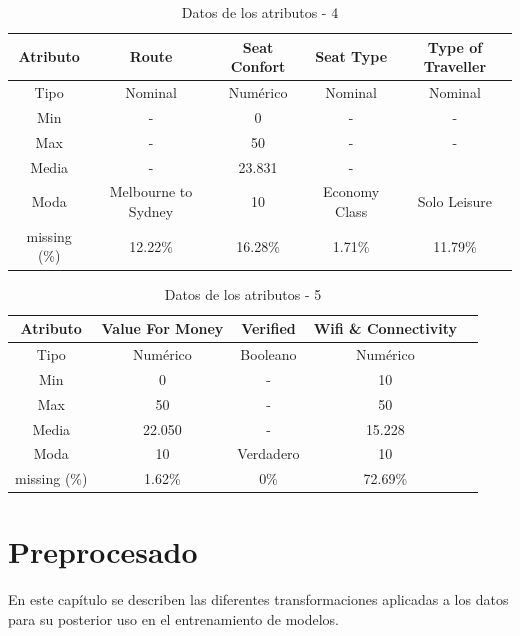 \documentclass[es]{uc3mreport}
\begin{document}
\begin{report}
\begin{table}[H]
    \center
    \begin{tabular}{@{}ccccc@{}}
        \toprule
        Atributo     & Route               & Seat Confort & Seat Type     & Type of Traveller \\ 
        \midrule
        Tipo         & Nominal             & Numérico     & Nominal       & Nominal           \\ 
        Min          & -                   & 0            & -             & -                 \\ 
        Max          & -                   & 50           & -             & -                 \\ 
        Media        & -                   & 23.831       & -             &                   \\ 
        Moda         & Melbourne to Sydney & 10           & Economy Class & Solo Leisure      \\ 
        missing (\%) & 12.22\%             & 16.28\%      & 1.71\%        & 11.79\%           \\ 
        \bottomrule
    \end{tabular} 
    \caption{Datos de los atributos - 4}
\end{table}
\begin{table}[H]
    \center
    \begin{tabular}{@{}ccccc@{}}
        \toprule
        Atributo     & Value For Money & Verified  & Wifi \& Connectivity \\ 
        \midrule
        Tipo         & Numérico        & Booleano  & Numérico             \\ 
        Min          & 0               & -         & 10                   \\ 
        Max          & 50              & -         & 50                   \\ 
        Media        & 22.050          & -         & 15.228               \\ 
        Moda         & 10              & Verdadero & 10                   \\ 
        missing (\%) & 1.62\%          & 0\%       & 72.69\%              \\ 
        \bottomrule
    \end{tabular} 
    \caption{Datos de los atributos - 5}
\end{table}

\section{Preprocesado}
\label{chap:preprocess}
En este capítulo se describen las diferentes transformaciones aplicadas a los datos para su posterior uso en el entrenamiento de modelos.


\end{report}
\end{document}

